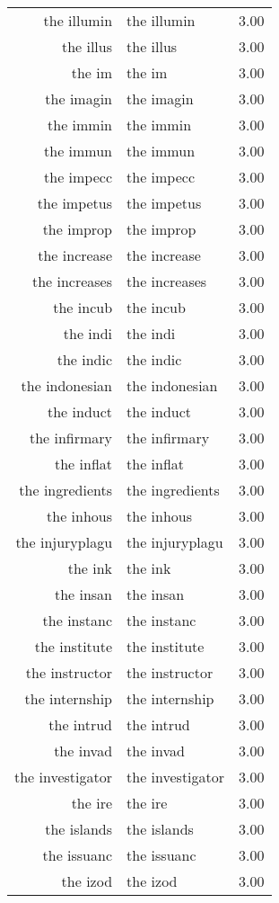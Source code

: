 \begin{table}[ht]
\begin{tabular}{rlr}
  the illumin & the illumin & 3.00 \\ 
  the illus & the illus & 3.00 \\ 
  the im & the im & 3.00 \\ 
  the imagin & the imagin & 3.00 \\ 
  the immin & the immin & 3.00 \\ 
  the immun & the immun & 3.00 \\ 
  the impecc & the impecc & 3.00 \\ 
  the impetus & the impetus & 3.00 \\ 
  the improp & the improp & 3.00 \\ 
  the increase & the increase & 3.00 \\ 
  the increases & the increases & 3.00 \\ 
  the incub & the incub & 3.00 \\ 
  the indi & the indi & 3.00 \\ 
  the indic & the indic & 3.00 \\ 
  the indonesian & the indonesian & 3.00 \\ 
  the induct & the induct & 3.00 \\ 
  the infirmary & the infirmary & 3.00 \\ 
  the inflat & the inflat & 3.00 \\ 
  the ingredients & the ingredients & 3.00 \\ 
  the inhous & the inhous & 3.00 \\ 
  the injuryplagu & the injuryplagu & 3.00 \\ 
  the ink & the ink & 3.00 \\ 
  the insan & the insan & 3.00 \\ 
  the instanc & the instanc & 3.00 \\ 
  the institute & the institute & 3.00 \\ 
  the instructor & the instructor & 3.00 \\ 
  the internship & the internship & 3.00 \\ 
  the intrud & the intrud & 3.00 \\ 
  the invad & the invad & 3.00 \\ 
  the investigator & the investigator & 3.00 \\ 
  the ire & the ire & 3.00 \\ 
  the islands & the islands & 3.00 \\ 
  the issuanc & the issuanc & 3.00 \\ 
  the izod & the izod & 3.00 \\ 

\end{tabular}
\end{table}
